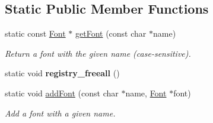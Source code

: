 \subsection*{Static Public Member Functions}
\begin{DoxyCompactItemize}
\item 
static const \hyperlink{classGUI_1_1Font}{Font} $\ast$ \hyperlink{classGUI_1_1Font_a19c023d747809a4cfa6142d33bdff53a}{get\-Font} (const char $\ast$name)
\begin{DoxyCompactList}\small\item\em Return a font with the given name (case-\/sensitive). \end{DoxyCompactList}\item 
\hypertarget{classGUI_1_1Font_a35420e48c05e7e803704fe3b53ed7592}{static void {\bfseries registry\-\_\-freeall} ()}\label{classGUI_1_1Font_a35420e48c05e7e803704fe3b53ed7592}

\item 
static void \hyperlink{classGUI_1_1Font_adf1307fcdb0008a32de8b09f5dfbe71e}{add\-Font} (const char $\ast$name, \hyperlink{classGUI_1_1Font}{Font} $\ast$font)
\begin{DoxyCompactList}\small\item\em Add a font with a given name. \end{DoxyCompactList}\end{DoxyCompactItemize}
